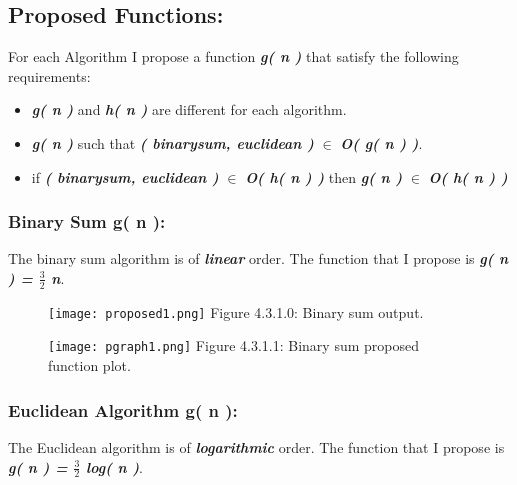 \documentclass[10pt,a4paper]{article}
\begin{document}
\pagebreak

\subsection{Proposed Functions:}

For each Algorithm I propose a function {\bfseries\itshape g( n )} that satisfy the following requirements: 

\begin{itemize}
\item {\bfseries\itshape g( n )} and {\bfseries\itshape h( n )} are different for each algorithm.
\item {\bfseries\itshape g( n )} such that {\bfseries\itshape ( binarysum, euclidean )} $\in$ {\bfseries\itshape O( g( n ) )}.
\item if {\bfseries\itshape ( binarysum, euclidean )} $\in$ {\bfseries\itshape O( h( n ) )} then {\bfseries\itshape g( n )} $\in$ {\bfseries\itshape O( h( n ) )}
\end{itemize}

\subsubsection{Binary Sum g( n ):}

The binary sum algorithm is of {\bfseries\itshape linear} order. The function that I propose is {\bfseries\itshape g( n ) = $\frac{3}{2}$ n}.

\begin{figure}[H]
\texttt{[image: proposed1.png]}
\centering \linebreak \linebreak Figure 4.3.1.0: Binary sum output.
\end{figure}

\begin{figure}[H]
\texttt{[image: pgraph1.png]}
\centering \linebreak \linebreak Figure 4.3.1.1: Binary sum proposed function plot.
\end{figure}

\pagebreak

\subsubsection{Euclidean Algorithm g( n ):}

The Euclidean algorithm is of {\bfseries\itshape logarithmic} order. The function that I propose is {\bfseries\itshape g( n ) = $\frac{3}{2}$ log( n )}.
\end{document}
